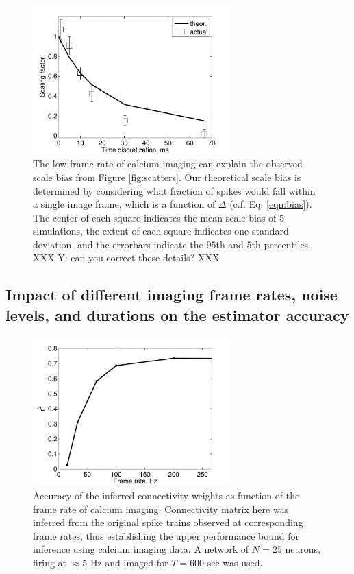 \begin{figure}[h]
\centering
\includegraphics[width=3in]{../figs/FigureA4_scale_bias}
\caption{The low-frame rate of calcium imaging can explain the observed scale bias from Figure \ref{fig:scatters}.  Our theoretical scale bias is determined by considering what fraction of spikes would fall within a single image frame, which is a function of $\Delta$ (c.f. Eq. \ref{eqn:bias}).  The center of each square indicates the mean scale bias of 5 simulations, the extent of each square indicates one standard deviation, and the errorbars indicate the $95$th and $5$th percentiles. XXX Y: can you correct these details? XXX}
\label{fig:bias}
\end{figure}


\subsection{Impact of different imaging frame rates, noise levels, and durations on the estimator accuracy}

\begin{figure}[h]
\centering
\includegraphics[width=3in]{../figs/FigureA5_recvar}
\caption{Accuracy of the inferred connectivity weights as function of the frame rate of calcium imaging. Connectivity matrix here was inferred from the original spike trains observed at corresponding frame rates, thus establishing the upper performance bound for inference using calcium imaging data. A network of $N=25$ neurons, firing at $\approx 5$ Hz and imaged for $T=600$ sec was used.}
\label{fig:recvar}
\end{figure}

